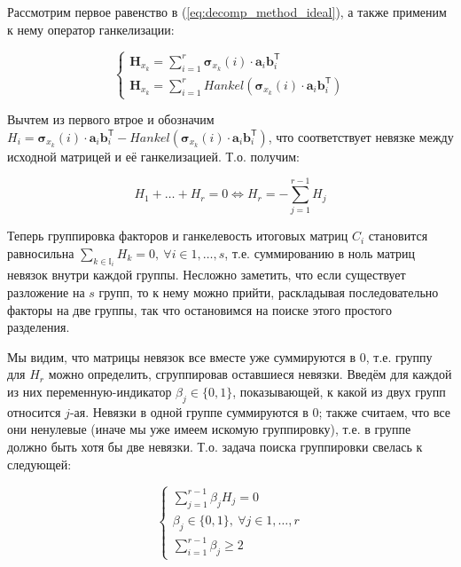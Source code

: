 	    	Рассмотрим первое равенство в (\ref{eq:decomp_method_ideal}), а также применим к нему оператор ганкелизации:
	    	
	    	\begin{equation*}
	    		\begin{cases*}
	    			\mathbf{H}_{x_k} = \sum\limits_{i = 1}^{r} \boldsymbol{\sigma}_{x_k}(i) \cdot \mathbf{a}_i  \mathbf{b}_i^{\mathsf{T}} \\
	    			\mathbf{H}_{x_k} = \sum\limits_{i = 1}^{r} Hankel(\boldsymbol{\sigma}_{x_k}(i) \cdot \mathbf{a}_i  \mathbf{b}_i^{\mathsf{T}})
	    		\end{cases*}
	    	\end{equation*}
	    	
	    	Вычтем из первого втрое и обозначим $ H_i = \boldsymbol{\sigma}_{x_k}(i) \cdot \mathbf{a}_i  \mathbf{b}_i^{\mathsf{T}} - Hankel(\boldsymbol{\sigma}_{x_k}(i) \cdot \mathbf{a}_i  \mathbf{b}_i^{\mathsf{T}}) $, что соответствует невязке между исходной матрицей и её ганкелизацией. Т.о. получим:
	    	
	    	\begin{equation*}
	    		H_1 + \ldots + H_r = 0 \Leftrightarrow H_r = - \sum\limits_{j = 1}^{r - 1} H_j
	    	\end{equation*}
	    	
	    	Теперь группировка факторов и ганкелевость итоговых матриц $ C_i $ становится равносильна $ \sum\limits_{k \in \mathbb{I}_i} H_k = 0, \  \forall i \in 1, \ldots, s $, т.е. суммированию в ноль матриц невязок внутри каждой группы. Несложно заметить, что если существует разложение на $ s $ групп, то к нему можно прийти, раскладывая последовательно факторы на две группы, так что остановимся на поиске этого простого разделения.
	    	
	    	Мы видим, что матрицы невязок все вместе уже суммируются в $ 0 $, т.е. группу для $ H_r $ можно определить, сгруппировав оставшиеся невязки. Введём для каждой из них переменную-индикатор $ \beta_j \in \{0, 1\} $, показывающей, к какой из двух групп относится $j$-ая. Невязки в одной группе суммируются в $ 0 $; также считаем, что все они ненулевые (иначе мы уже имеем искомую группировку), т.е. в группе должно быть хотя бы две невязки. Т.о. задача поиска группировки свелась к следующей:
	    	
	    	\begin{equation}
	    		\begin{cases*}
	    			\sum\limits_{j = 1}^{r - 1} \beta_j H_j = 0 \\
	    			\beta_j \in \{0, 1\}, \ \forall j \in 1, \ldots, r \\
	    			\sum\limits_{i = 1}^{r - 1} \beta_j \ge 2
	    		\end{cases*}
	    	\end{equation}
	    	

